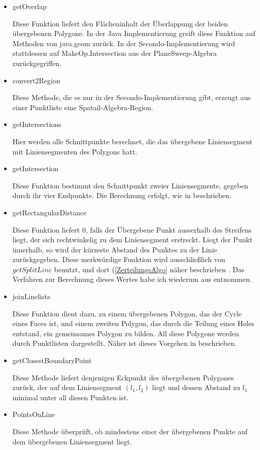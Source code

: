 \begin{itemize}
\item getOverlap

Diese Funktion liefert den Flächeninhalt der Überlappung der beiden übergebenen Polygone. In der Java Implementierung greift diese Funktion auf Methoden von java.geom zurück. In der Secondo-Implementierung wird stattdessen auf MakeOp.Intersection aus der PlaneSweep-Algebra zurückgegriffen.

\item convert2Region

Diese Methode, die es nur in der Secondo-Implementierung gibt, erzeugt aus einer Punktliste eine Spatail-Algebra-Region.

\item getIntersections

Hier werden alle Schnittpunkte berechnet, die das übergebene Liniensegment mit Liniensegmenten des Polygons hatt. 

\item getIntersection

Diese Funktion bestimmt den Schnittpunkt zweier Liniensegmente, gegeben durch ihr vier Endpunkte. Die Berechnung erfolgt, wie in \cite{BW} beschrieben.

\item getRectangularDistance

Diese Funktion liefert 0, falls der Übergebene Punkt ausserhalb des Streifens liegt, der sich rechtwinkelig zu dem Liniensegment erstreckt. Liegt der Punkt innerhalb, so wird der kürzeste Abstand des Punktes zu der Linie zurückgegeben. Diese merkwürdige Funktion wird ausschließlich von $getSplitLine$ benutzt, und dort (\ref{ZerteilungsAlgo} näher beschrieben . Das Verfahren zur Berechnung dieses Wertes habe ich wiederum aus \cite{BW} entnommen.

\item joinLinelists

Diese Funktion dient dazu, zu einem übergebenen Polygon, das der Cycle eines Faces ist, und einem zweiten Polygon, das durch die Teilung eines Holes entstand, ein gemeinsames Polygon zu bilden. All diese  Polygone werden durch Punktlisten dargestellt. Näher ist dieses Vorgehen in  beschrieben.

\item getClosestBoundaryPoint

Diese Methode liefert denjenigen Eckpunkt des übergebenen Polygones zurück, der auf dem Liniensegment $(l_1,l_2)$ liegt und dessen Abstand zu $l_1$ minimal unter all diesen Punkten ist.

\item PointsOnLine

Diese Methode überprüft, ob mindestens einer der übergebenen Punkte auf dem übergebenen Liniensegment liegt.

\end{itemize}



